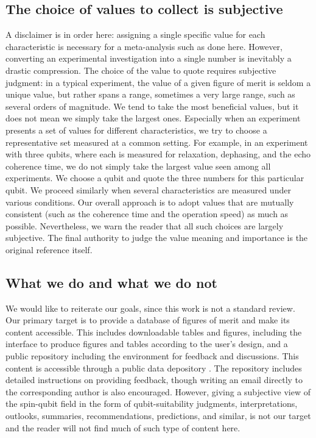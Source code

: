 \documentclass[aps, prx, showpacs, twocolumn, superscriptaddress, notitlepage, longbibliography, floatfix, nofootinbib]{revtex4-2}
\begin{document}
\subsection{The choice of values to collect is subjective}

A disclaimer is in order here: assigning a single specific value for each characteristic is necessary for a meta-analysis such as done here. However, converting an experimental investigation into a single number is inevitably a drastic compression. The choice of the value to quote requires subjective judgment: in a typical experiment, the value of a given figure of merit is seldom a unique value, but rather spans a range, sometimes a very large range, such as several orders of magnitude. We tend to take the most beneficial values, but it does not mean we simply take the largest ones. Especially when an experiment presents a set of values for different characteristics, we try to choose a representative set measured at a common setting. For example, in an experiment with three qubits, where each is measured for relaxation, dephasing, and the echo coherence time, we do not simply take the largest value seen among all experiments. We choose a qubit and quote the three numbers for this particular qubit. We proceed similarly when several characteristics are measured under various conditions. Our overall approach is to adopt values that are mutually consistent (such as the coherence time and the operation speed) as much as possible. Nevertheless, we warn the reader that all such choices are largely subjective. The final authority to judge the value meaning and importance is the original reference itself. 

\subsection{What we do and what we do not}

We would like to reiterate our goals, since this work is not a standard review. Our primary target is to provide a database of figures of merit and make its content accessible. This includes downloadable tables and figures, including the interface to produce figures and tables according to the user's design, and a public repository including the environment for feedback and discussions. This content is accessible through a public data depository \cite{noauthor_notitle_nodate}. The repository includes detailed instructions on providing feedback, though writing an email directly to the corresponding author is also encouraged. However, giving a subjective view of the spin-qubit field in the form of qubit-suitability judgments, interpretations, outlooks, summaries, recommendations, predictions, and similar, is not our target and the reader will not find much of such type of content here.
\end{document}
